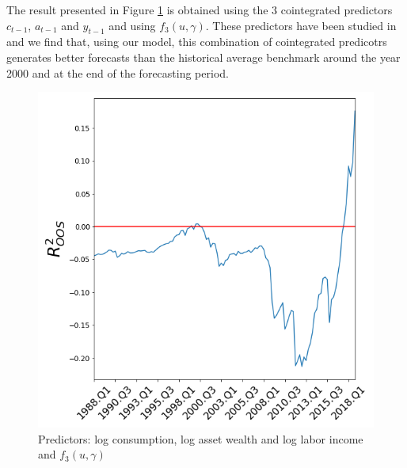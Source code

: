 \documentclass[a4paper,12pt,times,numbered,print,index]{report}
\numberwithin{equation}{section}
\begin{document}
	The result presented in Figure \ref{cwyf4} is obtained using the 3 cointegrated predictors $c_{t-1}$, $a_{t-1}$ and $y_{t-1}$ and using $f_3\left( u,\gamma\right)$. These predictors have been studied in \cite{lettau2001consumption} and we find that, using our model, this combination of cointegrated predicotrs generates better forecasts than the historical average benchmark around the year 2000 and at the end of the forecasting period. 
	
	
	\begin{figure}[H]
		\centering
		\captionsetup{justification=centering}
		\caption{Predictors: log consumption, log asset wealth and log labor income and  $f_{3}( u,\gamma)$ }
		\label{cwyf4}%
		\includegraphics[width=0.5\linewidth]{cwy(f4).png}
	\end{figure}
	
	
	
\end{document}
